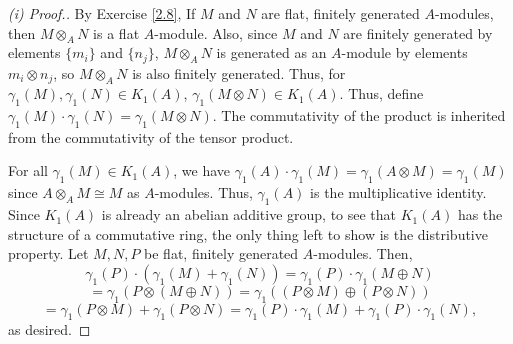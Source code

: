 \begin{proof}[(i) Proof.]
By Exercise \ref{2.8}, If $M$ and $N$ are flat, finitely generated $A$-modules, then $M \otimes_A N$ is a flat $A$-module. Also, since $M$ and $N$ are finitely generated 
by elements $\{m_i\}$ and $\{n_j\}$, $M \otimes_A N$ is generated as an $A$-module by elements $m_i \otimes n_j$, so $M \otimes_A N$ is also finitely generated. Thus,
for $\gamma_1(M),\gamma_1(N) \in K_1(A)$, $\gamma_1(M \otimes N) \in K_1(A)$. Thus, define $\gamma_1(M) \cdot \gamma_1(N) = \gamma_1(M \otimes N)$. The commutativity of
the product is inherited from the commutativity of the tensor product.

For all $\gamma_1(M) \in K_1(A)$, we have $\gamma_1(A) \cdot \gamma_1(M) = \gamma_1(A \otimes M) = \gamma_1(M)$ since $A \otimes_A M \cong M$ as $A$-modules. Thus, $\gamma_1(A)$
is the multiplicative identity. Since $K_1(A)$ is already an abelian additive group, to see that $K_1(A)$ has the structure of a commutative ring, the only thing left to show is
the distributive property. Let $M,N,P$ be flat, finitely generated $A$-modules. Then,
$$\gamma_1(P) \cdot (\gamma_1(M) + \gamma_1(N)) = \gamma_1(P) \cdot \gamma_1(M \oplus N)$$ 
$$= \gamma_1(P \otimes (M \oplus N)) = \gamma_1((P \otimes M) \oplus (P \otimes N))$$ 
$$= \gamma_1(P \otimes M) + \gamma_1(P \otimes N) = \gamma_1(P)\cdot \gamma_1(M) + \gamma_1(P) \cdot \gamma_1(N),$$
as desired.
\end{proof}

